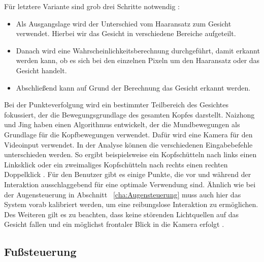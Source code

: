 \newline \newline
Für letztere Variante sind grob drei Schritte notwendig \cite{FaceTracking}:
\begin{itemize}
      \item Als Ausgangslage wird der Unterschied vom Haaransatz zum Gesicht verwendet. Hierbei wir das Gesicht in verschiedene Bereiche aufgeteilt.
			\item Danach wird eine Wahrscheinlichkeitsberechnung durchgeführt, damit erkannt werden kann, ob es sich bei den einzelnen Pixeln um den Haaransatz oder das Gesicht handelt.
			\item Abschließend kann auf Grund der Berechnung das Gesicht erkannt werden.
\end{itemize}
\vspace{\baselineskip}
Bei der Punkteverfolgung wird ein bestimmter Teilbereich des Gesichtes fokussiert, der die Bewegungsgrundlage des gesamten Kopfes darstellt. Naizhong und Jing \cite{MouthChinaControl} haben einen Algorithmus entwickelt, der die Mundbewegungen als Grundlage für die Kopfbewegungen verwendet. Dafür wird eine Kamera für den Videoinput verwendet. In der Analyse können die verschiedenen Eingabebefehle unterschieden werden. So ergibt beispielsweise ein Kopfschütteln nach links einen Linksklick oder ein zweimaliges Kopfschütteln nach rechts einen rechten Doppelklick \cite{MouthChinaControl}.
\newline \newline
Für den Benutzer gibt es einige Punkte, die vor und während der Interaktion ausschlaggebend für eine optimale Verwendung sind. Ähnlich wie bei der Augensteuerung in Abschnitt ~\ref{cha:Augensteuerung} muss auch hier das System vorab kalibriert werden, um eine reibungslose Interaktion zu ermöglichen. Des Weiteren gilt es zu beachten, dass keine störenden Lichtquellen auf das Gesicht fallen und ein möglichst frontaler Blick in die Kamera erfolgt \cite{MouthChinaControl}.


\subsection{Fußsteuerung}

